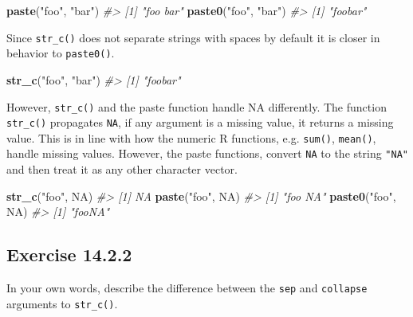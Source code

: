 \documentclass[]{book}
\newenvironment{Shaded}{\begin{snugshade}}{\end{snugshade}}
\newcommand{\CommentTok}[1]{\textcolor[rgb]{0.56,0.35,0.01}{\textit{#1}}}
\newcommand{\KeywordTok}[1]{\textcolor[rgb]{0.13,0.29,0.53}{\textbf{#1}}}
\newcommand{\NormalTok}[1]{#1}
\newcommand{\OtherTok}[1]{\textcolor[rgb]{0.56,0.35,0.01}{#1}}
\newcommand{\StringTok}[1]{\textcolor[rgb]{0.31,0.60,0.02}{#1}}
\theoremstyle{plain}
\theoremstyle{remark}
\begin{document}
\begin{Shaded}
\begin{Highlighting}[]
\KeywordTok{paste}\NormalTok{(}\StringTok{"foo"}\NormalTok{, }\StringTok{"bar"}\NormalTok{)}
\CommentTok{#> [1] "foo bar"}
\KeywordTok{paste0}\NormalTok{(}\StringTok{"foo"}\NormalTok{, }\StringTok{"bar"}\NormalTok{)}
\CommentTok{#> [1] "foobar"}
\end{Highlighting}
\end{Shaded}

Since \texttt{str\_c()} does not separate strings with spaces by default
it is closer in behavior to \texttt{paste0()}.

\begin{Shaded}
\begin{Highlighting}[]
\KeywordTok{str_c}\NormalTok{(}\StringTok{"foo"}\NormalTok{, }\StringTok{"bar"}\NormalTok{)}
\CommentTok{#> [1] "foobar"}
\end{Highlighting}
\end{Shaded}

However, \texttt{str\_c()} and the paste function handle NA differently.
The function \texttt{str\_c()} propagates \texttt{NA}, if any argument
is a missing value, it returns a missing value. This is in line with how
the numeric R functions, e.g. \texttt{sum()}, \texttt{mean()}, handle
missing values. However, the paste functions, convert \texttt{NA} to the
string \texttt{"NA"} and then treat it as any other character vector.

\begin{Shaded}
\begin{Highlighting}[]
\KeywordTok{str_c}\NormalTok{(}\StringTok{"foo"}\NormalTok{, }\OtherTok{NA}\NormalTok{)}
\CommentTok{#> [1] NA}
\KeywordTok{paste}\NormalTok{(}\StringTok{"foo"}\NormalTok{, }\OtherTok{NA}\NormalTok{)}
\CommentTok{#> [1] "foo NA"}
\KeywordTok{paste0}\NormalTok{(}\StringTok{"foo"}\NormalTok{, }\OtherTok{NA}\NormalTok{)}
\CommentTok{#> [1] "fooNA"}
\end{Highlighting}
\end{Shaded}

\hypertarget{exercise-14.2.2}{%
\subsection*{\texorpdfstring{Exercise
{14.2.2}}{Exercise 14.2.2}}\label{exercise-14.2.2}}

In your own words, describe the difference between the \texttt{sep} and
\texttt{collapse} arguments to \texttt{str\_c()}.
\end{document}
